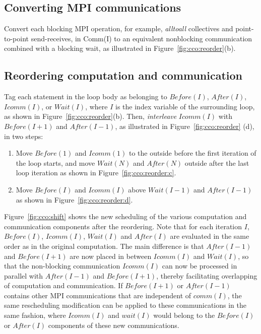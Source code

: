 \subsection{Converting MPI communications}

Convert each blocking MPI operation, for example, {\em alltoall} collectives
and point-to-point send-receives, in Comm(I) to an equivalent
nonblocking communication combined with a blocking wait, as illustrated in
Figure~\ref{fig:cco:reorder}(b).


\subsection{Reordering computation and communication}

Tag each statement in the loop body as belonging to $Before(I)$,
$After(I)$, $Icomm(I)$, or $Wait(I)$, where $I$ is the index
variable of the surrounding loop, as shown in Figure~\ref{fig:cco:reorder}(b).
Then, \emph{interleave} $Icomm(I)$ with $Before(I+1)$ and $After(I-1)$, as illustrated in
Figure~\ref{fig:cco:reorder} (d), in two steps:

\begin{enumerate}

\item Move $Before(1)$ and $Icomm(1)$ to the outside before the first
  iteration of the loop starts, and move $Wait(N)$ and $After(N)$
  outside after the last loop iteration as shown in
  Figure~\ref{fig:cco:reorder:c}.

\item Move $Before(I)$ and $Icomm(I)$ above $Wait(I-1)$ and
  $After(I-1)$ as shown in Figure~\ref{fig:cco:reorder:d}.

\end{enumerate}
Figure~\ref{fig:cco:shift} shows the new scheduling of the various computation and communication components after the reordering.
 Note that for each iteration $I$, $Before(I)$, $Icomm(I)$, $Wait(I)$ and $After(I)$ are evaluated in the same order as in the original
 computation. The main difference is that $After(I-1)$ and $Before(I+1)$ are now placed in between $Icomm(I)$ and $Wait(I)$, 
 so that the non-blocking communication $Icomm(I)$ can now be processed in parallel with $After(I-1)$ and $Before(I+1)$,
 thereby facilitating overlapping of computation and communication. If $Before(I+1)$ or $After(I-1)$ contains other MPI communications
that are independent of $comm(I)$, the same rescheduling modification can be applied to these communications in the same fashion, where $Icomm(I)$ and $wait(I)$ would belong to the $Before(I)$ or $After(I)$ components of these new communications. 


